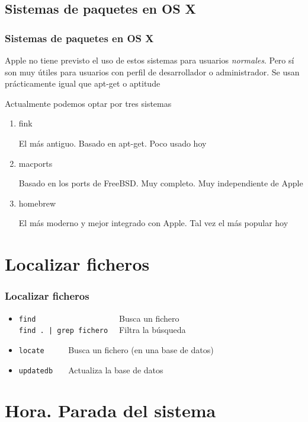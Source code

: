 \documentclass[ucs]{beamer}
\begin{document}
\begin{frame}[fragile]
\subsection{Sistemas de paquetes en OS X}
\frametitle{Sistemas de paquetes en OS X}

Apple no tiene previsto el uso de estos sistemas para
usuarios \emph{normales}. Pero sí son muy útiles para usuarios
con perfil de desarrollador o administrador. Se usan prácticamente
igual que apt-get o aptitude

Actualmente podemos 
optar por tres sistemas
\begin{enumerate}
\item
fink 

El más antiguo. Basado en apt-get. Poco usado hoy
\item
macports

Basado en los ports de FreeBSD. Muy completo. Muy independiente de Apple

\item
homebrew

El más moderno y mejor integrado con Apple. Tal vez el más popular
hoy
\end{enumerate}

\end{frame}


\section{Localizar ficheros}
\begin{frame}[fragile]
\frametitle{Localizar ficheros}
\begin{itemize}
\item 
\verb|find                   | Busca un fichero  \\
\verb!find . | grep fichero  ! Filtra la búsqueda
\item 
\verb|locate     | Busca un fichero (en una base de datos)
\item 
\verb|updatedb   | Actualiza la base de datos

\end{itemize}
\end{frame}


\section{Hora. Parada del sistema}
\end{document}
